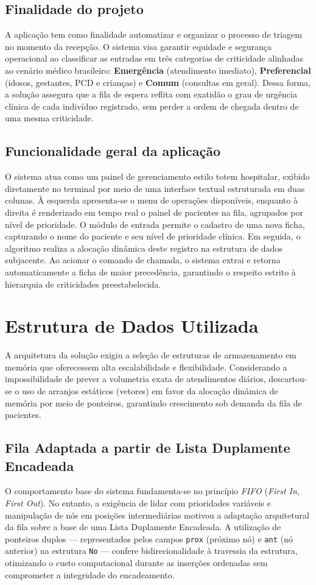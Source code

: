 \documentclass[12pt,a4paper]{article}
\begin{document}
\subsection{Finalidade do projeto}
A aplicação tem como finalidade automatizar e organizar o processo de triagem no momento da recepção. O sistema visa garantir equidade e segurança operacional ao classificar as entradas em três categorias de criticidade alinhadas ao cenário médico brasileiro: \textbf{Emergência} (atendimento imediato), \textbf{Preferencial} (idosos, gestantes, PCD e crianças) e \textbf{Comum} (consultas em geral). Dessa forma, a solução assegura que a fila de espera reflita com exatidão o grau de urgência clínica de cada indivíduo registrado, sem perder a ordem de chegada dentro de uma mesma criticidade.

\subsection{Funcionalidade geral da aplicação}
O sistema atua como um painel de gerenciamento estilo totem hospitalar, exibido diretamente no terminal por meio de uma interface textual estruturada em duas colunas. À esquerda apresenta-se o menu de operações disponíveis, enquanto à direita é renderizado em tempo real o painel de pacientes na fila, agrupados por nível de prioridade. O módulo de entrada permite o cadastro de uma nova ficha, capturando o nome do paciente e seu nível de prioridade clínica. Em seguida, o algoritmo realiza a alocação dinâmica deste registro na estrutura de dados subjacente. Ao acionar o comando de chamada, o sistema extrai e retorna automaticamente a ficha de maior precedência, garantindo o respeito estrito à hierarquia de criticidades preestabelecida.


\section{Estrutura de Dados Utilizada}
\label{sec:estrutura_dados}
A arquitetura da solução exigiu a seleção de estruturas de armazenamento em memória que oferecessem alta escalabilidade e flexibilidade. Considerando a impossibilidade de prever a volumetria exata de atendimentos diários, descartou-se o uso de arranjos estáticos (vetores) em favor da alocação dinâmica de memória por meio de ponteiros, garantindo crescimento sob demanda da fila de pacientes.

\subsection{Fila Adaptada a partir de Lista Duplamente Encadeada}
O comportamento base do sistema fundamenta-se no princípio \textit{FIFO} (\textit{First In, First Out}). No entanto, a exigência de lidar com prioridades variáveis e manipulação de nós em posições intermediárias motivou a adaptação arquitetural da fila sobre a base de uma Lista Duplamente Encadeada. A utilização de ponteiros duplos --- representados pelos campos \texttt{prox} (próximo nó) e \texttt{ant} (nó anterior) na estrutura \texttt{No} --- confere bidirecionalidade à travessia da estrutura, otimizando o custo computacional durante as inserções ordenadas sem comprometer a integridade do encadeamento.
\end{document}
